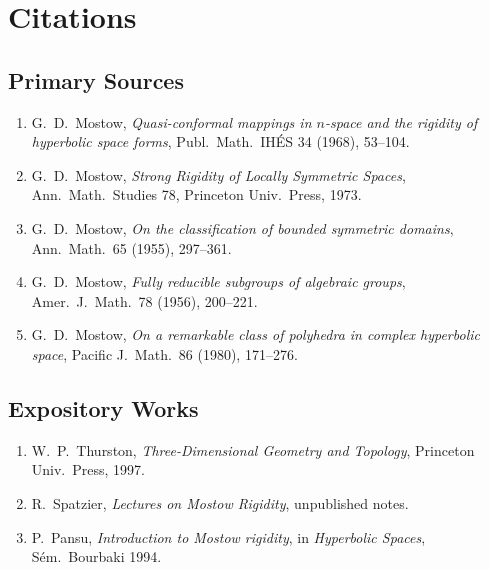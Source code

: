 \section{Citations}\subsection*{Primary Sources}
\begin{enumerate}
    \item G.\ D.\ Mostow, \textit{Quasi-conformal mappings in $n$-space and the rigidity of hyperbolic space forms}, Publ.\ Math.\ IH\'ES 34 (1968), 53--104.
    \item G.\ D.\ Mostow, \textit{Strong Rigidity of Locally Symmetric Spaces}, Ann.\ Math.\ Studies 78, Princeton Univ.\ Press, 1973.
    \item G.\ D.\ Mostow, \textit{On the classification of bounded symmetric domains}, Ann.\ Math.\ 65 (1955), 297--361.
    \item G.\ D.\ Mostow, \textit{Fully reducible subgroups of algebraic groups}, Amer.\ J.\ Math.\ 78 (1956), 200--221.
    \item G.\ D.\ Mostow, \textit{On a remarkable class of polyhedra in complex hyperbolic space}, Pacific J.\ Math.\ 86 (1980), 171--276.
\end{enumerate}

\subsection*{Expository Works}
\begin{enumerate}
    \item W.\ P.\ Thurston, \textit{Three-Dimensional Geometry and Topology}, Princeton Univ.\ Press, 1997.
    \item R.\ Spatzier, \textit{Lectures on Mostow Rigidity}, unpublished notes.
    \item P.\ Pansu, \textit{Introduction to Mostow rigidity}, in \textit{Hyperbolic Spaces}, S\'em.\ Bourbaki 1994.
\end{enumerate}

